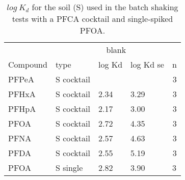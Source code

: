 \begin{table}[ht]
\caption{$log~K_d$ for the soil (S) used in the batch shaking tests with a PFCA cocktail and single-spiked PFOA.}
\centering
\label{apptab:soil_Kd}
\begin{tabular}{llllr} \toprule
         & \multicolumn{4}{c}{blank}                                \\ \cline{2-5} 
Compound & type        & log Kd & log Kd se & \multicolumn{1}{l}{n} \\ \midrule
PFPeA    & S cocktail &        &           & 3                     \\
PFHxA    & S cocktail & 2.34   & 3.29      & 3                     \\
PFHpA    & S cocktail & 2.17   & 3.00      & 3                     \\
PFOA     & S cocktail & 2.72   & 4.35      & 3                     \\
PFNA     & S cocktail & 2.57   & 4.63      & 3                     \\
PFDA     & S cocktail & 2.55   & 5.19      & 3                     \\
PFOA     & S single    & 2.82   & 3.90      & \multicolumn{1}{l}{3} \\ \bottomrule
\end{tabular}
\end{table}


